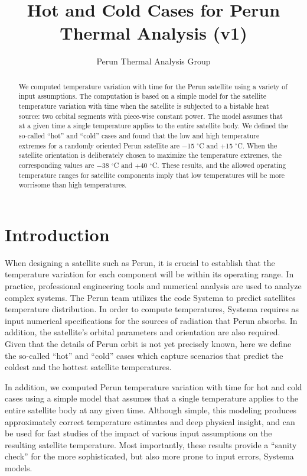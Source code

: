 \documentclass[]{aastex62}
\begin{document}
\title{Hot and Cold Cases for Perun Thermal Analysis (v1)}  
 

\author{Perun Thermal Analysis Group}

\begin{abstract}
We computed temperature variation with time for the Perun satellite using a variety of input
assumptions. The computation is based on a simple model for the satellite temperature variation 
with time when the satellite is subjected to a bistable heat source: two orbital segments with 
piece-wise constant power. The model assumes that at a given time a single temperature applies 
to the entire satellite body. 
We defined the so-called ``hot'' and ``cold'' cases and found that the low and high temperature 
extremes for a randomly oriented Perun satellite are $-$15 $^\circ$C and $+$15 $^\circ$C. When the 
satellite orientation is deliberately chosen to maximize the temperature extremes, the corresponding 
values are $-$38 $^\circ$C and $+$40 $^\circ$C. These results, and the allowed operating temperature
ranges for satellite components imply that low temperatures will be more worrisome than high
temperatures. 
\end{abstract}



\section{Introduction}
 
When designing a satellite such as Perun, it is crucial to establish that the temperature variation for 
each component will be within its operating range. In practice, professional engineering tools and 
numerical analysis are used to analyze complex systems. The Perun team utilizes the code Systema
to predict satellites temperature distribution. In order to compute temperatures, Systema requires
as input numerical specifications for the sources of radiation that Perun absorbs. In addition, 
the satellite's orbital parameters and orientation are also required. Given that the details of 
Perun orbit is not yet precisely known, here we define the so-called ``hot'' and ``cold'' 
cases which capture scenarios that predict the coldest and the hottest satellite temperatures. 
 
In addition, we computed Perun temperature variation with time for hot and cold cases using
a simple model that assumes that a single temperature applies to the entire satellite body 
at any given time. Although simple, this modeling produces approximately correct temperature
estimates and deep physical insight, and can be used for fast studies of the impact of various
input assumptions on the resulting satellite temperature. Most importantly, these results 
provide a ``sanity check'' for the more sophisticated, but also more prone to input errors, 
Systema models.
 
\end{document}
